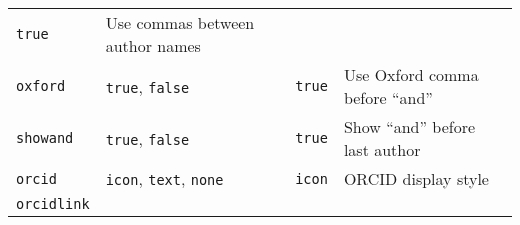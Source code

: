 \documentclass[
]{article}
\begin{document}
\begin{longtable}[]{@{}llll@{}}
\begin{minipage}[t]{0.21\columnwidth}
\texttt{true}\strut
\end{minipage} & \begin{minipage}[t]{0.30\columnwidth}\raggedright
Use commas between author names\strut
\end{minipage}\tabularnewline
\begin{minipage}[t]{0.19\columnwidth}\raggedright
\texttt{oxford}\strut
\end{minipage} & \begin{minipage}[t]{0.19\columnwidth}\raggedright
\texttt{true}, \texttt{false}\strut
\end{minipage} & \begin{minipage}[t]{0.21\columnwidth}\raggedright
\texttt{true}\strut
\end{minipage} & \begin{minipage}[t]{0.30\columnwidth}\raggedright
Use Oxford comma before ``and''\strut
\end{minipage}\tabularnewline
\begin{minipage}[t]{0.19\columnwidth}\raggedright
\texttt{showand}\strut
\end{minipage} & \begin{minipage}[t]{0.19\columnwidth}\raggedright
\texttt{true}, \texttt{false}\strut
\end{minipage} & \begin{minipage}[t]{0.21\columnwidth}\raggedright
\texttt{true}\strut
\end{minipage} & \begin{minipage}[t]{0.30\columnwidth}\raggedright
Show ``and'' before last author\strut
\end{minipage}\tabularnewline
\begin{minipage}[t]{0.19\columnwidth}\raggedright
\texttt{orcid}\strut
\end{minipage} & \begin{minipage}[t]{0.19\columnwidth}\raggedright
\texttt{icon}, \texttt{text}, \texttt{none}\strut
\end{minipage} & \begin{minipage}[t]{0.21\columnwidth}\raggedright
\texttt{icon}\strut
\end{minipage} & \begin{minipage}[t]{0.30\columnwidth}\raggedright
ORCID display style\strut
\end{minipage}\tabularnewline
\begin{minipage}[t]{0.19\columnwidth}\raggedright
\texttt{orcidlink}\strut
\end{minipage} & \begin{minipage}[t]{0.19\columnwidth}\raggedright

\end{minipage}
\end{longtable}
\end{document}
